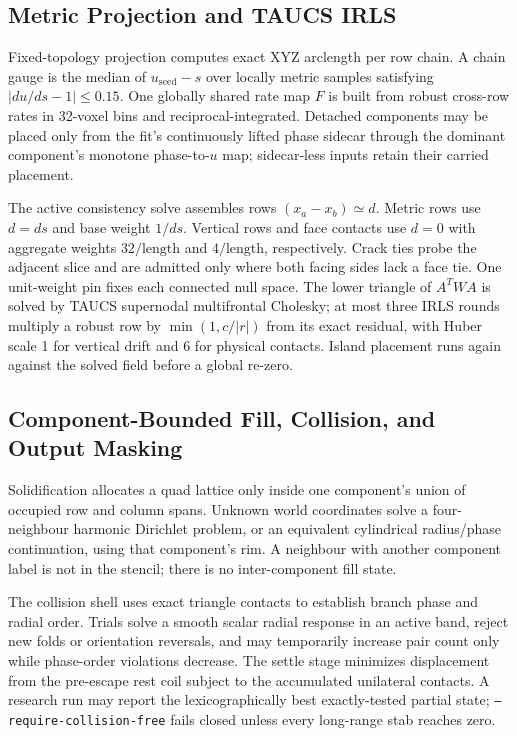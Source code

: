 \subsection{Metric Projection and TAUCS IRLS}
\label{app:metric-irls}

Fixed-topology projection computes exact XYZ arclength per row chain. A chain gauge is the median of $u_{\mathrm{seed}}-s$ over locally metric samples satisfying $|du/ds-1|\le0.15$. One globally shared rate map $F$ is built from robust cross-row rates in 32-voxel bins and reciprocal-integrated. Detached components may be placed only from the fit's continuously lifted phase sidecar through the dominant component's monotone phase-to-$u$ map; sidecar-less inputs retain their carried placement.

The active consistency solve assembles rows $(x_a-x_b)\simeq d$. Metric rows use $d=ds$ and base weight $1/ds$. Vertical rows and face contacts use $d=0$ with aggregate weights $32/\text{length}$ and $4/\text{length}$, respectively. Crack ties probe the adjacent slice and are admitted only where both facing sides lack a face tie. One unit-weight pin fixes each connected null space. The lower triangle of $A^TWA$ is solved by TAUCS supernodal multifrontal Cholesky; at most three IRLS rounds multiply a robust row by $\min(1,c/|r|)$ from its exact residual, with Huber scale 1 for vertical drift and 6 for physical contacts. Island placement runs again against the solved field before a global re-zero.

\subsection{Component-Bounded Fill, Collision, and Output Masking}
\label{app:solid}

Solidification allocates a quad lattice only inside one component's union of occupied row and column spans. Unknown world coordinates solve a four-neighbour harmonic Dirichlet problem, or an equivalent cylindrical radius/phase continuation, using that component's rim. A neighbour with another component label is not in the stencil; there is no inter-component fill state.

The collision shell uses exact triangle contacts to establish branch phase and radial order. Trials solve a smooth scalar radial response in an active band, reject new folds or orientation reversals, and may temporarily increase pair count only while phase-order violations decrease. The settle stage minimizes displacement from the pre-escape rest coil subject to the accumulated unilateral contacts. A research run may report the lexicographically best exactly-tested partial state; \texttt{--require-collision-free} fails closed unless every long-range stab reaches zero.

